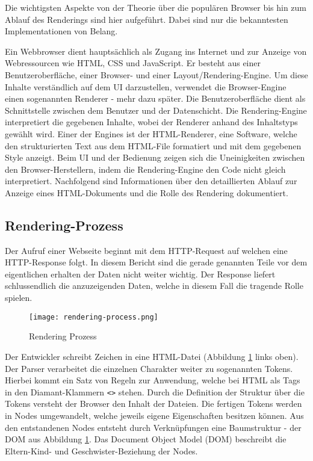Die wichtigsten Aspekte von der Theorie über die populären Browser bis hin zum Ablauf des Renderings sind hier aufgeführt.
Dabei sind nur die bekanntesten Implementationen von Belang.

Ein Webbrowser dient hauptsächlich als Zugang ins Internet und zur Anzeige von Webressourcen wie HTML, CSS und JavaScript.
Er besteht aus einer Benutzeroberfläche, einer Browser- und einer Layout/Rendering-Engine.
Um diese Inhalte verständlich auf dem UI darzustellen, verwendet die Browser-Engine einen sogenannten Renderer - mehr dazu später.
Die Benutzeroberfläche dient als Schnittstelle zwischen dem Benutzer und der Datenschicht. 
Die Rendering-Engine interpretiert die gegebenen Inhalte, wobei der Renderer anhand des Inhaltstyps gewählt wird. 
Einer der Engines ist der HTML-Renderer, eine Software, welche den strukturierten Text aus dem HTML-File formatiert und mit dem gegebenen Style anzeigt.
Beim UI und der Bedienung zeigen sich die Uneinigkeiten zwischen den Browser-Herstellern, indem die Rendering-Engine den Code nicht gleich interpretiert.
Nachfolgend sind Informationen über den detaillierten Ablauf zur Anzeige eines HTML-Dokuments und die Rolle des Rendering dokumentiert.


\subsection{Rendering-Prozess}
\label{sec:structureRendering}

Der Aufruf einer Webseite beginnt mit dem HTTP-Request auf welchen eine HTTP-Response folgt.
In diesem Bericht sind die gerade genannten Teile vor dem eigentlichen erhalten der Daten nicht weiter wichtig.
Der Response liefert schlussendlich die anzuzeigenden Daten, welche in diesem Fall die tragende Rolle spielen.

\begin{figure}[!htb]
    \centering
    \texttt{[image: rendering-process.png]}
    \caption{Rendering Prozess}
    \label{img:RenderingProcess}
\end{figure}

Der Entwickler schreibt Zeichen in eine HTML-Datei (Abbildung \ref{img:RenderingProcess} links oben).
Der Parser verarbeitet die einzelnen Charakter weiter zu sogenannten Tokens.
Hierbei kommt ein Satz von Regeln zur Anwendung, welche bei HTML als Tags in den Diamant-Klammern \texttt{<>} stehen.
Durch die Definition der Struktur über die Tokens versteht der Browser den Inhalt der Dateien.
Die fertigen Tokens werden in Nodes umgewandelt, welche jeweils eigene Eigenschaften besitzen können.
Aus den entstandenen Nodes entsteht durch Verknüpfungen eine Baumstruktur - der DOM aus Abbildung \ref{img:RenderingProcess}.
Das Document Object Model (DOM) beschreibt die Eltern-Kind- und Geschwister-Beziehung der Nodes.

